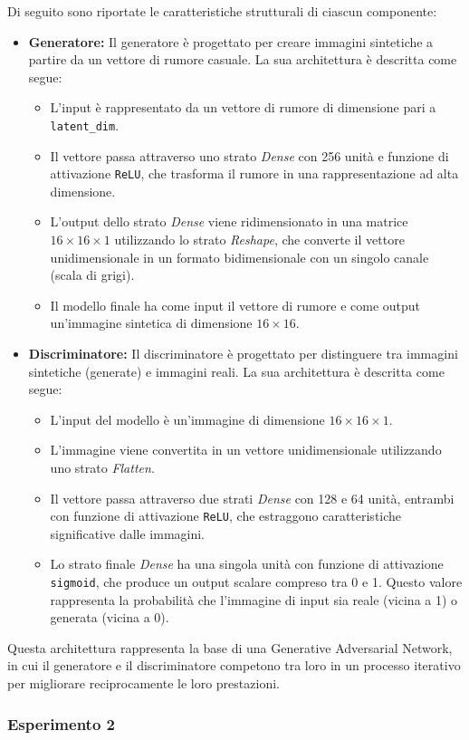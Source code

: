 Di seguito sono riportate le caratteristiche strutturali di ciascun componente:
\begin{itemize}
    \item \textbf{Generatore:} 
    Il generatore è progettato per creare immagini sintetiche a partire da un vettore di rumore casuale. La sua architettura è descritta come segue:
    \begin{itemize}
        \item L'input è rappresentato da un vettore di rumore di dimensione pari a \texttt{latent\_dim}.
        \item Il vettore passa attraverso uno strato \textit{Dense} con 256 unità e funzione di attivazione \texttt{ReLU}, che trasforma il rumore in una rappresentazione ad alta dimensione.
        \item L'output dello strato \textit{Dense} viene ridimensionato in una matrice \(16 \times 16 \times 1\) utilizzando lo strato \textit{Reshape}, che converte il vettore unidimensionale in un formato bidimensionale con un singolo canale (scala di grigi).
        \item Il modello finale ha come input il vettore di rumore e come output un'immagine sintetica di dimensione \(16 \times 16\).
    \end{itemize}

    \item \textbf{Discriminatore:} 
    Il discriminatore è progettato per distinguere tra immagini sintetiche (generate) e immagini reali. La sua architettura è descritta come segue:
    \begin{itemize}
        \item L'input del modello è un'immagine di dimensione \(16 \times 16 \times 1\).
        \item L'immagine viene convertita in un vettore unidimensionale utilizzando uno strato \textit{Flatten}.
        \item Il vettore passa attraverso due strati \textit{Dense} con 128 e 64 unità, entrambi con funzione di attivazione \texttt{ReLU}, che estraggono caratteristiche significative dalle immagini.
        \item Lo strato finale \textit{Dense} ha una singola unità con funzione di attivazione \texttt{sigmoid}, che produce un output scalare compreso tra 0 e 1. Questo valore rappresenta la probabilità che l'immagine di input sia reale (vicina a 1) o generata (vicina a 0).
    \end{itemize}
\end{itemize}
Questa architettura rappresenta la base di una Generative Adversarial Network, in cui il generatore e il discriminatore competono tra loro in un processo iterativo per migliorare reciprocamente le loro prestazioni.

\subsubsection{Esperimento 2} 